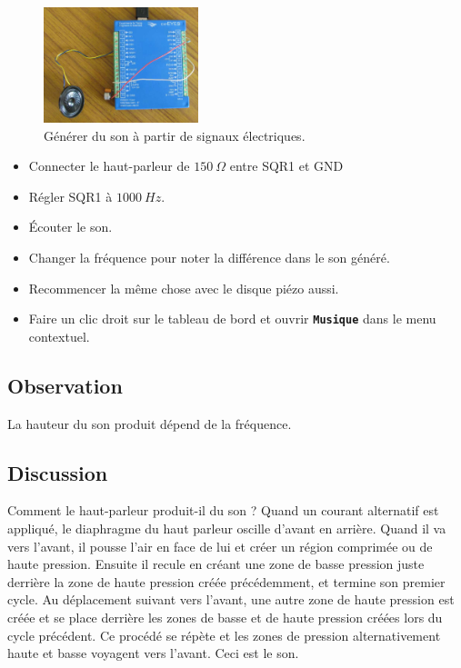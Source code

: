 \documentclass{book}
\newcommand{\nop}{}
\begin{document}
\begin{figure}[h!]
\begin{center}
\caption{\label{fig:Generating-sound}Générer du son à partir de signaux électriques. }\vspace{0.5em}
\includegraphics[width=0.4\textwidth, height=0.3\textwidth, keepaspectratio]{Pic-sound-speaker-photo.png}
\end{center}
\end{figure}



\begin{itemize}
  \item Connecter le haut-parleur de $150\ \Omega$  entre SQR1 et GND
  \item Régler SQR1 à $1000\ Hz$.
  \item Écouter le son.
  \item Changer la fréquence pour noter la différence dans le son généré.
  \item Recommencer la même chose avec le disque piézo aussi.
  \item Faire un clic droit sur le tableau de bord et ouvrir  \texttt{\textbf{Musique}\nop} dans le menu contextuel.
\end{itemize}

\subsection{Observation}


La hauteur du son produit dépend de la fréquence.

\subsection{Discussion}


Comment le haut-parleur produit-il du son ? Quand un courant alternatif est appliqué, le diaphragme du haut parleur oscille d'avant en arrière. Quand il va vers l'avant, il pousse l'air en face de lui et créer un région comprimée ou de haute pression. Ensuite il recule en créant une zone de basse pression juste derrière la zone de haute pression créée précédemment, et termine son premier cycle. Au déplacement suivant vers l'avant, une autre zone de haute pression est créée et se place derrière les zones de basse et de haute pression créées lors du cycle précédent. Ce procédé se répète et les zones de pression alternativement haute et basse voyagent vers l'avant. Ceci est le son.
\end{document}
